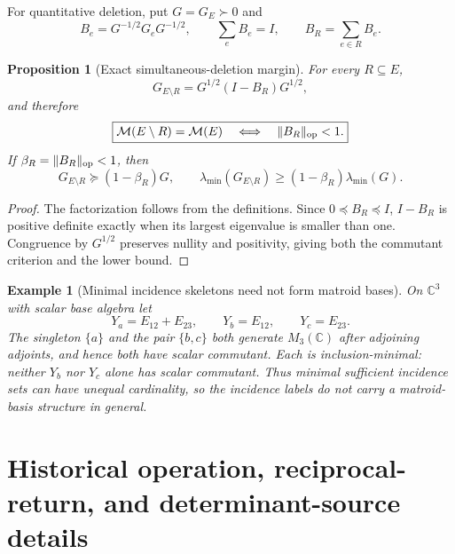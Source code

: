 \documentclass[11pt]{article}
\newtheorem{proposition}[theorem]{Proposition}
\newtheorem{example}[theorem]{Example}
\theoremstyle{definition}
\theoremstyle{remark}
\newcommand{\C}{\mathbb C}
\newcommand{\M}{\mathcal M}
\begin{document}
For quantitative deletion, put $G=G_E\succ0$ and
\[
 B_e=G^{-1/2}G_eG^{-1/2},\qquad \sum_eB_e=I,
 \qquad B_R=\sum_{e\in R}B_e.
\]

\begin{proposition}[Exact simultaneous-deletion margin]
\label{prop:deletion-margin}
For every $R\subseteq E$,
\begin{equation}
 G_{E\setminus R}=G^{1/2}(I-B_R)G^{1/2},
 \label{eq:deletion-factor}
\end{equation}
and therefore
\begin{equation}
 \boxed{\M(E\setminus R)=\M(E)
 \quad\Longleftrightarrow\quad \|B_R\|_{\rm op}<1.}
 \label{eq:deletion-margin}
\end{equation}
If $\beta_R=\|B_R\|_{\rm op}<1$, then
\[
 G_{E\setminus R}\succeq(1-\beta_R)G,
 \qquad
 \lambda_{\min}(G_{E\setminus R})
 \ge(1-\beta_R)\lambda_{\min}(G).
\]
\end{proposition}

\begin{proof}
The factorization follows from the definitions.  Since
$0\preceq B_R\preceq I$, $I-B_R$ is positive definite exactly when its
largest eigenvalue is smaller than one.  Congruence by $G^{1/2}$ preserves
nullity and positivity, giving both the commutant criterion and the lower
bound.
\end{proof}

\begin{example}[Minimal incidence skeletons need not form matroid bases]
\label{ex:nonmatroid-skeleton}
On $\C^3$ with scalar base algebra let
\[
 Y_a=E_{12}+E_{23},\qquad Y_b=E_{12},\qquad Y_c=E_{23}.
\]
The singleton $\{a\}$ and the pair $\{b,c\}$ both generate $M_3(\C)$ after
adjoining adjoints, and hence both have scalar commutant.  Each is
inclusion-minimal: neither $Y_b$ nor $Y_c$ alone has scalar commutant.  Thus
minimal sufficient incidence sets can have unequal cardinality, so the
incidence labels do not carry a matroid-basis structure in general.
\end{example}

\section{Historical operation, reciprocal-return, and determinant-source details}
\label{app:historical-source-selection}
\end{document}
